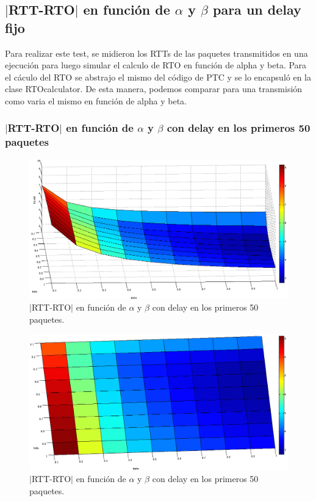 \documentclass[10pt, a4paper]{article}
\begin{document}
\subsection{$|$RTT-RTO$|$ en función de $\alpha$ y $\beta$ para un delay fijo}

Para realizar este test, se midieron los RTTs de las paquetes transmitidos en una ejecución para luego simular el calculo de RTO en función de alpha y beta.
Para el cáculo del RTO se abstrajo el mismo del código de PTC y se lo encapsuló en la clase RTOcalculator. De esta manera, podemos comparar para una transmisión como varia el mismo en función de alpha y beta.

\subsubsection{$|$RTT-RTO$|$ en función de $\alpha$ y $\beta$ con delay en los primeros 50 paquetes}
\begin{figure}[H]
\begin{center}
\includegraphics[width=17cm]{delay-50F.png}
\caption{$|$RTT-RTO$|$ en función de $\alpha$ y $\beta$ con delay en los primeros 50 paquetes.}
\end{center}
\end{figure}

\begin{figure}[H]
\begin{center}
\includegraphics[width=17cm]{delay-50F-costado.png}
\caption{$|$RTT-RTO$|$ en función de $\alpha$ y $\beta$ con delay en los primeros 50 paquetes.}
\end{center}
\end{figure}
\end{document}
